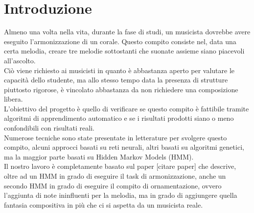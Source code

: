 \chapter{Introduzione}\label{ch:intro}

Almeno una volta nella vita, durante la fase di studi, un musicista dovrebbe avere eseguito l'armonizzazione di un corale. Questo compito consiste nel, data una certa melodia, creare tre melodie sottostanti che suonate assieme siano piacevoli all'ascolto. \\
Ciò viene richiesto ai musicisti in quanto è abbastanza aperto per valutare le capacità dello studente, ma allo stesso tempo data la presenza di strutture piuttosto rigorose, è vincolato abbastanza da non richiedere una composizione libera. \\
L'obiettivo del progetto è quello di verificare se questo compito è fattibile tramite algoritmi di apprendimento automatico e se i risultati prodotti siano o meno confondibili con risultati reali.\\
Numerose tecniche sono state presentate in letterature per svolgere questo compito, alcuni approcci basati su reti neurali, altri basati su algoritmi genetici, ma la maggior parte basati su Hidden Markov Models (HMM). \\
Il nostro lavoro è completamente basato sul paper [citare paper] che descrive, oltre ad un HMM in grado di eseguire il task di armonizzazione, anche un secondo HMM in grado di eseguire il compito di ornamentazione, ovvero l'aggiunta di note ininfluenti per la melodia, ma in grado di aggiungere quella fantasia compositiva in più che ci si aspetta da un musicista reale.

